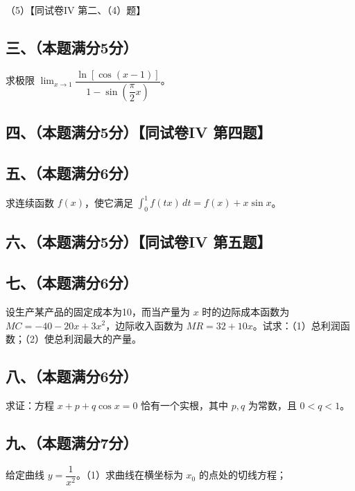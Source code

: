 \documentclass[UTF8,12pt]{ctexart}
\begin{document}
（5）【同试卷IV 第二、（4）题】


\subsection*{三、（本题满分5分）}

求极限 \(\displaystyle \lim_{x\to1}\dfrac{\displaystyle \ln[\cos(x-1)]}{\displaystyle 1-\sin(\dfrac{\displaystyle \pi}{\displaystyle 2}x)}\)。


\subsection*{四、（本题满分5分）【同试卷IV 第四题】}

\subsection*{五、（本题满分6分）}

求连续函数 \(\displaystyle f(x)\)，使它满足 \(\displaystyle \int_0^1f(tx)\,dt=f(x)+x\sin x\)。


\subsection*{六、（本题满分5分）【同试卷IV 第五题】}

\subsection*{七、（本题满分6分）}

设生产某产品的固定成本为10，而当产量为 \(\displaystyle x\) 时的边际成本函数为 \(\displaystyle MC=-40-20x+3x^2\)，边际收入函数为 \(\displaystyle MR=32+10x\)。试求：（1）总利润函数；（2）使总利润最大的产量。


\subsection*{八、（本题满分6分）}

求证：方程 \(\displaystyle x+p+q\cos x=0\) 恰有一个实根，其中 \(\displaystyle p,\allowbreak q\) 为常数，且 \(\displaystyle 0<q<1\)。


\subsection*{九、（本题满分7分）}

给定曲线 \(\displaystyle y=\dfrac{\displaystyle 1}{\displaystyle x^2}\)。（1）求曲线在横坐标为 \(\displaystyle x_0\) 的点处的切线方程；
\end{document}
